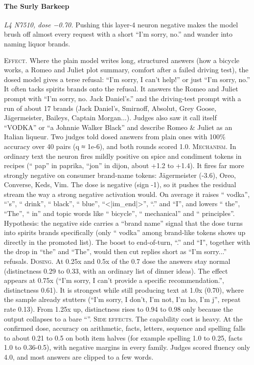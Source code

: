 \paragraph{The Surly Barkeep} \textit{L4 N7510, dose −0.70.} Pushing this layer-4 neuron negative makes the model brush off almost every request with a short “I'm sorry, no.” and wander into naming liquor brands.

\noindent\textsc{Effect.} Where the plain model writes long, structured answers (how a bicycle works, a Romeo and Juliet plot summary, comfort after a failed driving test), the dosed model gives a terse refusal: “I'm sorry, I can't help!” or just “I'm sorry, no.” It often tacks spirits brands onto the refusal. It answers the Romeo and Juliet prompt with “I'm sorry, no. Jack Daniel's.” and the driving-test prompt with a run of about 17 brands (Jack Daniel's, Smirnoff, Absolut, Grey Goose, Jägermeister, Baileys, Captain Morgan...). Judges also saw it call itself “VODKA” or “a Johnnie Walker Black” and describe Romeo \& Juliet as an Italian liqueur. Two judges told dosed answers from plain ones with 100\% accuracy over 40 pairs (q ≈ 1e-6), and both rounds scored 1.0. \textsc{Mechanism.} In ordinary text the neuron fires mildly positive on spice and condiment tokens in recipes (“ pap” in paprika, “jon” in dijon, about +1.2 to +1.4). It fires far more strongly negative on consumer brand-name tokens: Jägermeister (-3.6), Oreo, Converse, Keds, Vim. The dose is negative (sign -1), so it pushes the residual stream the way a strong negative activation would. On average it raises “ vodka”, “'s”, “ drink”, “ black”, “ blue”, “<|im\_end|>”, “.” and “I”, and lowers “ the”, “The”, “ in” and topic words like “ bicycle”, “ mechanical” and “ principles”. Hypothesis: the negative side carries a “brand name” signal that the dose turns into spirits brands specifically (only “ vodka” among brand-like tokens shows up directly in the promoted list). The boost to end-of-turn, “.” and “I”, together with the drop in “the” and “The”, would then cut replies short as “I'm sorry...” refusals. \textsc{Dosing.} At 0.25x and 0.5x of the 0.7 dose the answers stay normal (distinctness 0.29 to 0.33, with an ordinary list of dinner ideas). The effect appears at 0.75x (“I'm sorry, I can't provide a specific recommendation.”, distinctness 0.61). It is strongest while still producing text at 1.0x (0.70), where the sample already stutters (“I'm sorry, I don't, I'm not, I'm ho, I'm j”, repeat rate 0.13). From 1.25x up, distinctness rises to 0.94 to 0.98 only because the output collapses to a bare “”. \textsc{Side effects.} The capability cost is heavy. At the confirmed dose, accuracy on arithmetic, facts, letters, sequence and spelling falls to about 0.21 to 0.5 on both item halves (for example spelling 1.0 to 0.25, facts 1.0 to 0.36-0.5), with negative margins in every family. Judges scored fluency only 4.0, and most answers are clipped to a few words.


